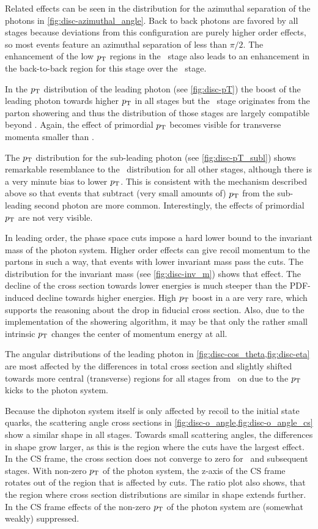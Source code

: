 Related effects can be seen in the distribution for the azimuthal
separation of the photons in \cref{fig:disc-azimuthal_angle}. Back to
back photons are favored by all stages because deviations from
this configuration are purely higher order effects, so most events
feature an azimuthal separation of less than \(\pi/2\). The
enhancement of the low \(p_\mathrm{T}\) regions in the \stthree\ stage also
leads to an enhancement in the back-to-back region for this stage over
the \sttwo\ stage.

In the \(p_\mathrm{T}\) distribution of the leading photon (see
\cref{fig:disc-pT}) the boost of the leading photon towards higher
\(p_\mathrm{T}\) in all stages but the \stone\ stage originates from the parton
showering and thus the distribution of those stages are largely
compatible beyond . Again, the effect of primordial \(p_\mathrm{T}\)
becomes visible for transverse momenta smaller than .

The \(p_\mathrm{T}\) distribution for the sub-leading photon (see
\cref{fig:disc-pT_subl}) shows remarkable resemblance to the \stone\
distribution for all other stages, although there is a very minute
bias to lower \(p_\mathrm{T}\). This is consistent with the mechanism described
above so that events that subtract (very small amounts of) \(p_\mathrm{T}\)
from the sub-leading second photon are more common. Interestingly, the
effects of primordial \(p_\mathrm{T}\) are not very visible.

In leading order, the phase space cuts impose a hard lower bound to
the invariant mass of the photon system. Higher order effects can give
recoil momentum to the partons in such a way, that events with lower
invariant mass pass the cuts. The distribution for the invariant mass
(see \cref{fig:disc-inv_m}) shows that effect. The decline of the
cross section towards lower energies is much steeper than the
PDF-induced decline towards higher energies. High \(p_\mathrm{T}\) boost in a
are very rare, which supports the reasoning about the drop in fiducial
cross section. Also, due to the implementation of the showering
algorithm, it may be that only the rather small intrinsic \(p_\mathrm{T}\)
changes the center of momentum energy at all.

The angular distributions of the leading photon in
\cref{fig:disc-cos_theta,fig:disc-eta} are most affected by the
differences in total cross section and slightly shifted towards more
central (transverse) regions for all stages from \sttwo\ on due to the
\(p_\mathrm{T}\) kicks to the photon system.

Because the diphoton system itself is only affected by recoil to the
initial state quarks, the scattering angle cross sections in
\cref{fig:disc-o_angle,fig:disc-o_angle_cs} show a similar shape in
all stages. Towards small scattering angles, the differences in shape
grow larger, as this is the region where the cuts have the largest
effect. In the CS frame, the cross section does not converge to zero
for \sttwo\ and subsequent stages. With non-zero \(p_\mathrm{T}\) of the photon
system, the z-axis of the CS frame rotates out of the region that is
affected by cuts. The ratio plot also shows, that the region where
cross section distributions are similar in shape extends further. In
the CS frame effects of the non-zero \(p_\mathrm{T}\) of the photon system are
(somewhat weakly) suppressed.

